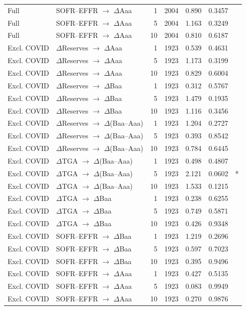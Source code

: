 \begin{table}[H]
{\begin{tabular}{llrrrrl}
  Full & SOFR--EFFR $\rightarrow$ $\Delta$Aaa & 1 & 2004 & 0.890 & 0.3457 &  \\ 
  Full & SOFR--EFFR $\rightarrow$ $\Delta$Aaa & 5 & 2004 & 1.163 & 0.3249 &  \\ 
  Full & SOFR--EFFR $\rightarrow$ $\Delta$Aaa & 10 & 2004 & 0.810 & 0.6187 &  \\ 
  Excl. COVID & $\Delta$Reserves $\rightarrow$ $\Delta$Aaa & 1 & 1923 & 0.539 & 0.4631 &  \\ 
  Excl. COVID & $\Delta$Reserves $\rightarrow$ $\Delta$Aaa & 5 & 1923 & 1.173 & 0.3199 &  \\ 
  Excl. COVID & $\Delta$Reserves $\rightarrow$ $\Delta$Aaa & 10 & 1923 & 0.829 & 0.6004 &  \\ 
  Excl. COVID & $\Delta$Reserves $\rightarrow$ $\Delta$Baa & 1 & 1923 & 0.312 & 0.5767 &  \\ 
  Excl. COVID & $\Delta$Reserves $\rightarrow$ $\Delta$Baa & 5 & 1923 & 1.479 & 0.1935 &  \\ 
  Excl. COVID & $\Delta$Reserves $\rightarrow$ $\Delta$Baa & 10 & 1923 & 1.116 & 0.3456 &  \\ 
  Excl. COVID & $\Delta$Reserves $\rightarrow$ $\Delta$(Baa--Aaa) & 1 & 1923 & 1.204 & 0.2727 &  \\ 
  Excl. COVID & $\Delta$Reserves $\rightarrow$ $\Delta$(Baa--Aaa) & 5 & 1923 & 0.393 & 0.8542 &  \\ 
  Excl. COVID & $\Delta$Reserves $\rightarrow$ $\Delta$(Baa--Aaa) & 10 & 1923 & 0.784 & 0.6445 &  \\ 
  Excl. COVID & $\Delta$TGA $\rightarrow$ $\Delta$(Baa--Aaa) & 1 & 1923 & 0.498 & 0.4807 &  \\ 
  Excl. COVID & $\Delta$TGA $\rightarrow$ $\Delta$(Baa--Aaa) & 5 & 1923 & 2.121 & 0.0602 & * \\ 
  Excl. COVID & $\Delta$TGA $\rightarrow$ $\Delta$(Baa--Aaa) & 10 & 1923 & 1.533 & 0.1215 &  \\ 
  Excl. COVID & $\Delta$TGA $\rightarrow$ $\Delta$Baa & 1 & 1923 & 0.238 & 0.6255 &  \\ 
  Excl. COVID & $\Delta$TGA $\rightarrow$ $\Delta$Baa & 5 & 1923 & 0.749 & 0.5871 &  \\ 
  Excl. COVID & $\Delta$TGA $\rightarrow$ $\Delta$Baa & 10 & 1923 & 0.426 & 0.9348 &  \\ 
  Excl. COVID & SOFR--EFFR $\rightarrow$ $\Delta$Baa & 1 & 1923 & 1.219 & 0.2696 &  \\ 
  Excl. COVID & SOFR--EFFR $\rightarrow$ $\Delta$Baa & 5 & 1923 & 0.597 & 0.7023 &  \\ 
  Excl. COVID & SOFR--EFFR $\rightarrow$ $\Delta$Baa & 10 & 1923 & 0.395 & 0.9496 &  \\ 
  Excl. COVID & SOFR--EFFR $\rightarrow$ $\Delta$Aaa & 1 & 1923 & 0.427 & 0.5135 &  \\ 
  Excl. COVID & SOFR--EFFR $\rightarrow$ $\Delta$Aaa & 5 & 1923 & 0.083 & 0.9949 &  \\ 
  Excl. COVID & SOFR--EFFR $\rightarrow$ $\Delta$Aaa & 10 & 1923 & 0.270 & 0.9876 &  \\ 
   \bottomrule
\end{tabular}
}
\end{table}

